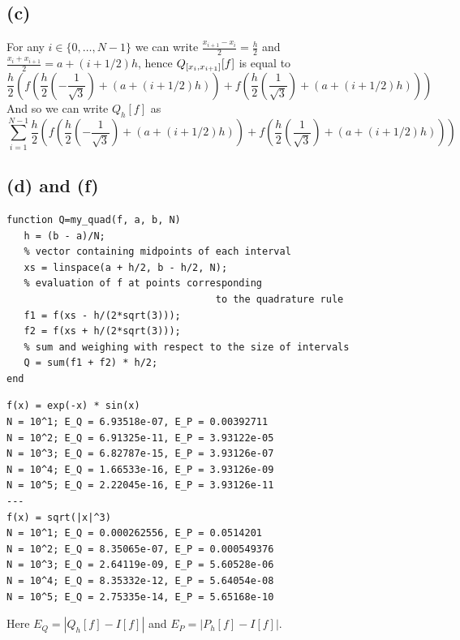 \documentclass{article}
\begin{document}
\subsection*{(c)}
For any $i \in \{0, \dots, N - 1\}$ we can write
$\frac{x_{i+1} - x_i}{2} = \frac{h}{2}$
and $\frac{x_i + x_{i + 1}}{2} = a + (i + 1/2)h$, hence
$Q_{[x_i, x_{i + 1}]}[f]$ is equal to
\begin{equation*}
   \frac{h}{2}\left(
      f\left(\frac{h}{2}\left(-\frac{1}{\sqrt{3}}\right)
      + (a + (i + 1/2)h)\right) + 
      f\left(\frac{h}{2}\left(\frac{1}{\sqrt{3}}\right)
      + (a + (i + 1/2)h)\right)
   \right)
\end{equation*}
And so we can write $Q_h[f]$ as 
\begin{equation*}
   \sum_{i = 1}^{N - 1}
   \frac{h}{2}\left(
      f\left(\frac{h}{2}\left(-\frac{1}{\sqrt{3}}\right)
      + (a + (i + 1/2)h)\right) + 
      f\left(\frac{h}{2}\left(\frac{1}{\sqrt{3}}\right)
      + (a + (i + 1/2)h)\right)
   \right)
\end{equation*}

\subsection*{(d) and (f)}

\begin{Verbatim}[frame=single,
   label=\textsc{Matlab} code - my\_quad.m]
function Q=my_quad(f, a, b, N)
   h = (b - a)/N;
   % vector containing midpoints of each interval
   xs = linspace(a + h/2, b - h/2, N);
   % evaluation of f at points corresponding
                                    to the quadrature rule
   f1 = f(xs - h/(2*sqrt(3)));
   f2 = f(xs + h/(2*sqrt(3)));
   % sum and weighing with respect to the size of intervals
   Q = sum(f1 + f2) * h/2;
end
\end{Verbatim}

\begin{Verbatim}[frame=single,
   label=Output from main.m]
f(x) = exp(-x) * sin(x)
N = 10^1; E_Q = 6.93518e-07, E_P = 0.00392711
N = 10^2; E_Q = 6.91325e-11, E_P = 3.93122e-05
N = 10^3; E_Q = 6.82787e-15, E_P = 3.93126e-07
N = 10^4; E_Q = 1.66533e-16, E_P = 3.93126e-09
N = 10^5; E_Q = 2.22045e-16, E_P = 3.93126e-11
---
f(x) = sqrt(|x|^3)
N = 10^1; E_Q = 0.000262556, E_P = 0.0514201
N = 10^2; E_Q = 8.35065e-07, E_P = 0.000549376
N = 10^3; E_Q = 2.64119e-09, E_P = 5.60528e-06
N = 10^4; E_Q = 8.35332e-12, E_P = 5.64054e-08
N = 10^5; E_Q = 2.75335e-14, E_P = 5.65168e-10
\end{Verbatim}
Here $E_Q = |Q_h[f] - I[f]|$ and $E_P = |P_h[f] - I[f]|$.
\end{document}
